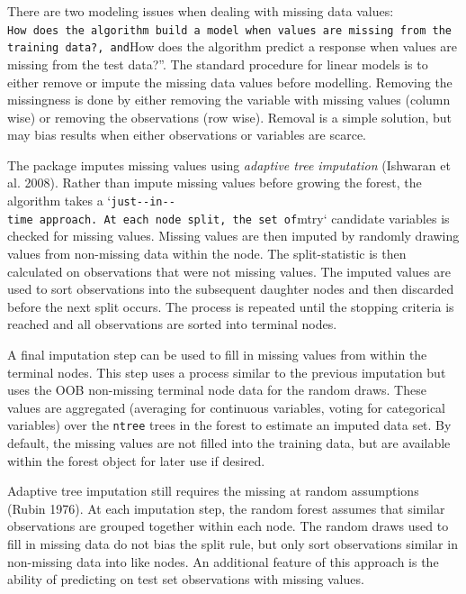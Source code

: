 \documentclass[article]{jss}
\begin{document}
There are two modeling issues when dealing with missing data values:
\texttt{How\ does\ the\ algorithm\ build\ a\ model\ when\ values\ are\ missing\ from\ the\ training\ data?\textquotesingle{}\textquotesingle{},\ and}How
does the algorithm predict a response when values are missing from the
test data?''. The standard procedure for linear models is to either
remove or impute the missing data values before modelling. Removing the
missingness is done by either removing the variable with missing values
(column wise) or removing the observations (row wise). Removal is a
simple solution, but may bias results when either observations or
variables are scarce.

The  package imputes missing values using
\emph{adaptive tree imputation} (Ishwaran et al. 2008). Rather than
impute missing values before growing the forest, the algorithm takes a
`\texttt{just-\/-in-\/-time\textquotesingle{}\textquotesingle{}\ approach.\ At\ each\ node\ split,\ the\ set\ of}mtry`
candidate variables is checked for missing values. Missing values are
then imputed by randomly drawing values from non-missing data within the
node. The split-statistic is then calculated on observations that were
not missing values. The imputed values are used to sort observations
into the subsequent daughter nodes and then discarded before the next
split occurs. The process is repeated until the stopping criteria is
reached and all observations are sorted into terminal nodes.

A final imputation step can be used to fill in missing values from
within the terminal nodes. This step uses a process similar to the
previous imputation but uses the OOB non-missing terminal node data for
the random draws. These values are aggregated (averaging for continuous
variables, voting for categorical variables) over the \texttt{ntree}
trees in the forest to estimate an imputed data set. By default, the
missing values are not filled into the training data, but are available
within the forest object for later use if desired.

Adaptive tree imputation still requires the missing at random
assumptions (Rubin 1976). At each imputation step, the random forest
assumes that similar observations are grouped together within each node.
The random draws used to fill in missing data do not bias the split
rule, but only sort observations similar in non-missing data into like
nodes. An additional feature of this approach is the ability of
predicting on test set observations with missing values.
\end{document}
